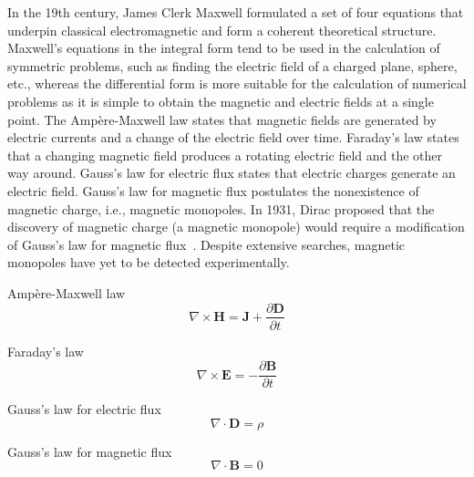 In the 19th century, James Clerk Maxwell formulated a set of four equations that underpin classical electromagnetic and form a coherent theoretical structure. 
Maxwell's equations in the integral form tend to be used in the calculation of symmetric problems, such as finding the electric field of a charged plane, sphere, etc., whereas the differential form is more suitable for the calculation of numerical problems as it is simple to obtain the magnetic and electric fields at a single point. The Ampère-Maxwell law states that magnetic fields are generated by electric currents and a change of the electric field over time. Faraday's law states that a changing magnetic field produces a rotating electric field and the other way around. Gauss's law for electric flux states that electric charges generate an electric field. Gauss's law for magnetic flux postulates the nonexistence of magnetic charge, i.e., magnetic monopoles. In 1931, Dirac proposed that the discovery of magnetic charge (a magnetic monopole) would require a modification of Gauss's law for magnetic flux~\cite{dirac1931monopole}.  Despite extensive searches, magnetic monopoles have yet to be detected experimentally. 


Ampère-Maxwell law
\begin{equation}
\nabla \times \mathbf{H} =\mathbf{J} + \frac{\partial \mathbf{D}}{\partial t}
\end{equation}

Faraday's law
\begin{equation}
\nabla \times \mathbf{E} = - \frac{\partial \mathbf{B}}{\partial t}
\end{equation}

Gauss's law for electric flux
\begin{equation}
\nabla \cdot \mathbf{D} = \rho
\end{equation}

Gauss's law for magnetic flux
\begin{equation}
\nabla \cdot \mathbf{B} = 0
\end{equation}




